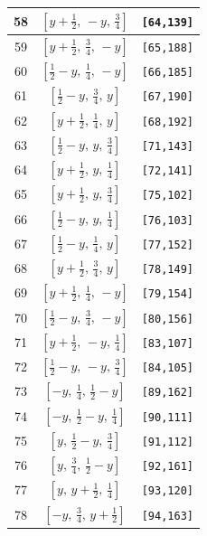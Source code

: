 \documentclass[fleqn,8pt]{jsarticle}
\begin{document}
\begin{longtable}{ccc}
58 & $\left[ y + \frac{1}{2},\, - y,\, \frac{3}{4} \right]$ & {\tt [64,139]} \\ \hline
59 & $\left[ y + \frac{1}{2},\, \frac{3}{4},\, - y \right]$ & {\tt [65,188]} \\ \hline
60 & $\left[ \frac{1}{2} - y,\, \frac{1}{4},\, - y \right]$ & {\tt [66,185]} \\ \hline
61 & $\left[ \frac{1}{2} - y,\, \frac{3}{4},\, y \right]$ & {\tt [67,190]} \\ \hline
62 & $\left[ y + \frac{1}{2},\, \frac{1}{4},\, y \right]$ & {\tt [68,192]} \\ \hline
63 & $\left[ \frac{1}{2} - y,\, y,\, \frac{3}{4} \right]$ & {\tt [71,143]} \\ \hline
64 & $\left[ y + \frac{1}{2},\, y,\, \frac{1}{4} \right]$ & {\tt [72,141]} \\ \hline
65 & $\left[ y + \frac{1}{2},\, y,\, \frac{3}{4} \right]$ & {\tt [75,102]} \\ \hline
66 & $\left[ \frac{1}{2} - y,\, y,\, \frac{1}{4} \right]$ & {\tt [76,103]} \\ \hline
67 & $\left[ \frac{1}{2} - y,\, \frac{1}{4},\, y \right]$ & {\tt [77,152]} \\ \hline
68 & $\left[ y + \frac{1}{2},\, \frac{3}{4},\, y \right]$ & {\tt [78,149]} \\ \hline
69 & $\left[ y + \frac{1}{2},\, \frac{1}{4},\, - y \right]$ & {\tt [79,154]} \\ \hline
70 & $\left[ \frac{1}{2} - y,\, \frac{3}{4},\, - y \right]$ & {\tt [80,156]} \\ \hline
71 & $\left[ y + \frac{1}{2},\, - y,\, \frac{1}{4} \right]$ & {\tt [83,107]} \\ \hline
72 & $\left[ \frac{1}{2} - y,\, - y,\, \frac{3}{4} \right]$ & {\tt [84,105]} \\ \hline
73 & $\left[ - y,\, \frac{1}{4},\, \frac{1}{2} - y \right]$ & {\tt [89,162]} \\ \hline
74 & $\left[ - y,\, \frac{1}{2} - y,\, \frac{1}{4} \right]$ & {\tt [90,111]} \\ \hline
75 & $\left[ y,\, \frac{1}{2} - y,\, \frac{3}{4} \right]$ & {\tt [91,112]} \\ \hline
76 & $\left[ y,\, \frac{3}{4},\, \frac{1}{2} - y \right]$ & {\tt [92,161]} \\ \hline
77 & $\left[ y,\, y + \frac{1}{2},\, \frac{1}{4} \right]$ & {\tt [93,120]} \\ \hline
78 & $\left[ - y,\, \frac{3}{4},\, y + \frac{1}{2} \right]$ & {\tt [94,163]} \\ \hline

\end{longtable}
\end{document}
